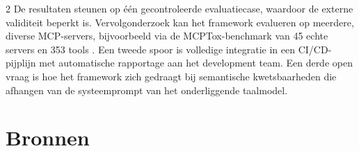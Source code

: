 \documentclass[a0,portrait]{hogent-poster}
\begin{document}
\begin{multicols}{2}
De resultaten steunen op één gecontroleerde evaluatiecase, waardoor de externe validiteit beperkt is. Vervolgonderzoek kan het framework evalueren op meerdere, diverse MCP-servers, bijvoorbeeld via de MCPTox-benchmark van 45 echte servers en 353 tools \autocite{wang2025mcptox}. Een tweede spoor is volledige integratie in een CI/CD-pijplijn met automatische rapportage aan het development team. Een derde open vraag is hoe het framework zich gedraagt bij semantische kwetsbaarheden die afhangen van de systeemprompt van het onderliggende taalmodel.

\section{Bronnen}
\printbibliography[heading=none]

\end{multicols}
\end{document}
